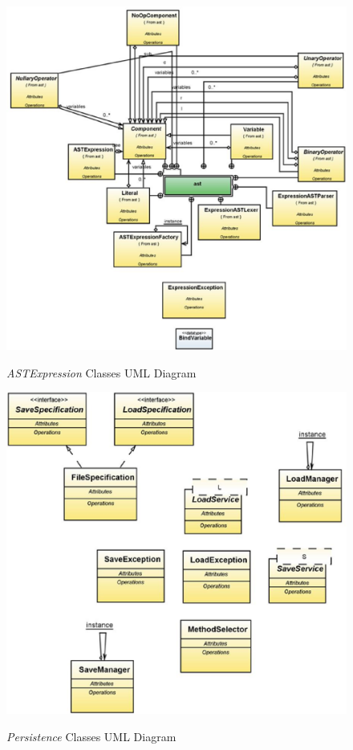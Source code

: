 \documentclass[11pt]{report}
\begin{document}
{\begin{figure}[h]
\centering
\scalebox{0.6} {
	\includegraphics{ExpressionUML}
}
\caption{{\textit{ASTExpression}} Classes UML Diagram}
\label{fig:ast}
\end{figure}

\begin{figure}[h]
\centering
\scalebox{0.6} {
	\includegraphics{PersistenceUML}
}
\caption{{\textit{Persistence}} Classes UML Diagram}
\label{fig:persistence}
\end{figure}
}
\end{document}
